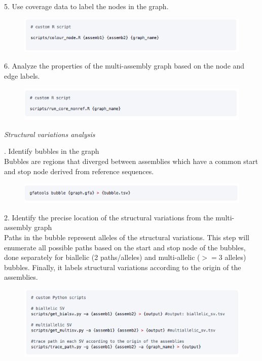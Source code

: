 \documentclass[../main.tex]{subfiles}
\begin{document}
\begin{flushleft}
\begin{figure}[!htb]
    \end{figure}
5. Use coverage data to label the nodes in the graph. \\
    \begin{figure}[!htb]
        \centering
        \includegraphics[width=\textwidth]{paper3/supplement/sp425.png}
    \end{figure}

6. Analyze the properties of the multi-assembly graph based on the node and edge labels. \\
    \begin{figure}[!htb]
        \centering
        \includegraphics[width=\textwidth]{paper3/supplement/sp426.png}
    \end{figure}

\bigskip

\emph{Structural variations analysis}

. Identify bubbles in the graph \\ Bubbles are regions that diverged between assemblies which have a common start and stop node derived from reference sequences. \\
\begin{figure}[!htb]
    \centering
    \includegraphics[width=\textwidth]{paper3/supplement/sp429.png}
\end{figure}

2. Identify the precise location of the structural variations from the multi-assembly graph \\ Paths in the bubble represent alleles of the structural variations. This step will enumerate all possible paths based on the start and stop node of the bubbles, done separately for biallelic (2 paths/alleles) and multi-allelic ($>=$3 alleles) bubbles. Finally, it labels structural variations according to the origin of the assemblies. \\
\begin{figure}[!htb]
    \centering
    \includegraphics[width=\textwidth]{paper3/supplement/sp430.png}
\end{figure}


\end{flushleft}
\end{document}
